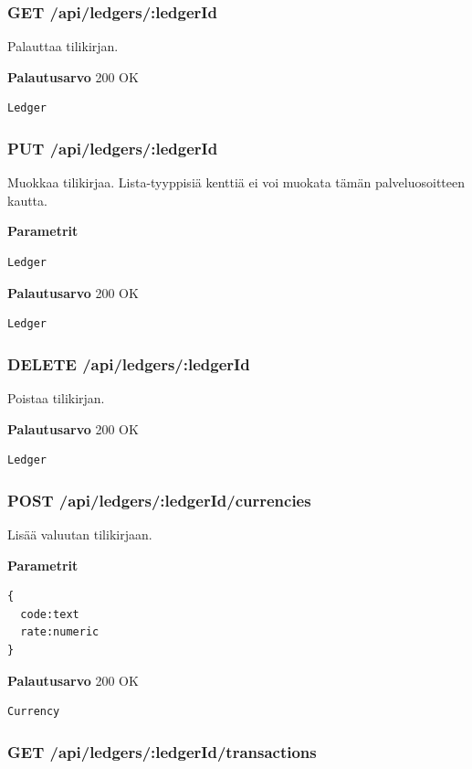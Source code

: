 \documentclass[a4paper,parskip=half]{scrartcl}
\begin{document}
\subsubsection{GET /api/ledgers/:ledgerId}

Palauttaa tilikirjan.

\textbf{Palautusarvo}
200 OK
\begin{Verbatim}
Ledger
\end{Verbatim}

\subsubsection{PUT /api/ledgers/:ledgerId}

Muokkaa tilikirjaa. Lista-tyyppisiä kenttiä ei voi muokata tämän
palveluosoitteen kautta.

\textbf{Parametrit}
\begin{Verbatim}
Ledger
\end{Verbatim}

\textbf{Palautusarvo}
200 OK
\begin{Verbatim}
Ledger
\end{Verbatim}

\subsubsection{DELETE /api/ledgers/:ledgerId}

Poistaa tilikirjan.

\textbf{Palautusarvo}
200 OK
\begin{Verbatim}
Ledger
\end{Verbatim}

\subsubsection{POST /api/ledgers/:ledgerId/currencies}

Lisää valuutan tilikirjaan.

\textbf{Parametrit}
\begin{Verbatim}
{
  code:text
  rate:numeric
}
\end{Verbatim}

\textbf{Palautusarvo}
200 OK
\begin{Verbatim}
Currency
\end{Verbatim}

\subsubsection{GET /api/ledgers/:ledgerId/transactions}
\end{document}
